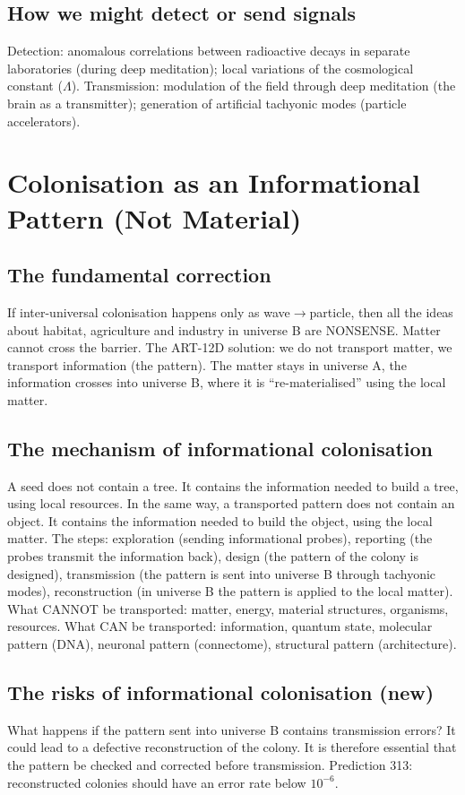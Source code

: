 \subsection{How we might detect or send signals}
Detection: anomalous correlations between radioactive decays in separate laboratories (during deep meditation); local variations of the cosmological constant ($\Lambda$). Transmission: modulation of the field through deep meditation (the brain as a transmitter); generation of artificial tachyonic modes (particle accelerators).

\section{Colonisation as an Informational Pattern (Not Material)}
\subsection{The fundamental correction}
If inter-universal colonisation happens only as wave$\to$particle, then all the ideas about habitat, agriculture and industry in universe B are NONSENSE. Matter cannot cross the barrier. The ART-12D solution: we do not transport matter, we transport information (the pattern). The matter stays in universe A, the information crosses into universe B, where it is ``re-materialised'' using the local matter.

\subsection{The mechanism of informational colonisation}
A seed does not contain a tree. It contains the information needed to build a tree, using local resources. In the same way, a transported pattern does not contain an object. It contains the information needed to build the object, using the local matter. The steps: exploration (sending informational probes), reporting (the probes transmit the information back), design (the pattern of the colony is designed), transmission (the pattern is sent into universe B through tachyonic modes), reconstruction (in universe B the pattern is applied to the local matter). What CANNOT be transported: matter, energy, material structures, organisms, resources. What CAN be transported: information, quantum state, molecular pattern (DNA), neuronal pattern (connectome), structural pattern (architecture).

\subsection{The risks of informational colonisation (new)}
What happens if the pattern sent into universe B contains transmission errors? It could lead to a defective reconstruction of the colony. It is therefore essential that the pattern be checked and corrected before transmission. Prediction 313: reconstructed colonies should have an error rate below $10^{-6}$.

